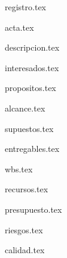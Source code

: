 \documentclass[12pt]{proyecto}
\begin{document}
\maketitle
\thispagestyle{empty}
\pagebreak


\thispagestyle{empty}
{\setlength{\parskip}{0pt}
\tableofcontents{}
}
\pagebreak


{registro.tex}

{acta.tex}

{descripcion.tex} %

{interesados.tex} %

{propositos.tex}

{alcance.tex} %

{supuestos.tex}



{entregables.tex} %

{wbs.tex} %

{recursos.tex}

{presupuesto.tex}
 

{riesgos.tex} %

{calidad.tex} %




\end{document}

